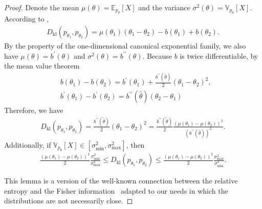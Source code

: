 \documentclass[twoside,11pt]{article}
\newcommand{\kl}{D_{\mathrm{kl}}}
\newcommand{\bbE}{\mathbb{E}}
\newcommand{\bbV}{\mathbb{V}}
\begin{document}
\begin{proof}
    Denote the mean $\mu(\theta)=\bbE_{p_\theta}[X] $ and the variance $\sigma^2(\theta)=\bbV_{p_\theta}[X]$.
    According to \citet[Lemma 6]{garivier2011KLUCB}, 
    \begin{align}
        \kl(p_{\theta_1},p_{\theta_2}) = \mu(\theta_1) (\theta_1-\theta_2)-b(\theta_1)+b(\theta_2).
    \end{align}
    By the property of the one-dimensional canonical exponential family, we also have $\mu(\theta)=b^\prime(\theta) $ and $\sigma^2(\theta)=b^{\prime\prime}(\theta) $. Because $b$ is twice differentiable, by the mean value theorem
    \begin{align}
        &b(\theta_1)-b(\theta_2)=b^\prime(\theta_1)+\frac{b^{\prime\prime}(\tilde{\theta})}{2} (\theta_1-\theta_2)^2,
        \\
        &b^{\prime}(\theta_1)-b^{\prime}(\theta_2)= b^{\prime\prime}(\hat{\theta}) (\theta_2-\theta_1)
    \end{align}
    Therefore, we have
    \begin{align}
        \kl(p_{\theta_1},p_{\theta_2}) 
        =
        \frac{b^{\prime\prime}(\tilde{\theta})}{2} (\theta_1-\theta_2)^2
        =
        \frac{b^{\prime\prime}(\tilde{\theta})}{2} \frac{(\mu(\theta_1)-\mu(\theta_2))^2}{(b^{\prime\prime}(\hat{\theta}))^2}.
    \end{align}
    Additionally, if $\bbV_{p_\theta}[X]\in [\sigma_{\min}^2,\sigma_{\max}^2]$, then
    \begin{align}
        \frac{(\mu(\theta_1)-\mu(\theta_2))^2}{2} \frac{\sigma_{\min}^2}{\sigma_{\max}^4} 
        \leq
        \kl(p_{\theta_1},p_{\theta_2}) 
        \leq
        \frac{(\mu(\theta_1)-\mu(\theta_2))^2}{2} \frac{\sigma_{\max}^2}{\sigma_{\min}^4} .
    \end{align}


    This lemma is a version of the well-known connection between the relative entropy and the Fisher information~\citep{amari2000methods} adapted to our needs in which the distributions are not necessarily close.
\end{proof}

% 
\vskip 0.2in



% 
\end{document}
